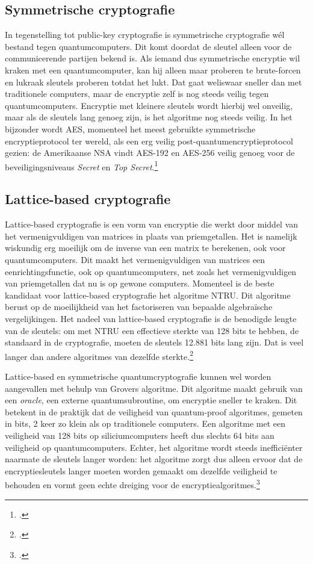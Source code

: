 \documentclass{report} %
\begin{document}
\subsection{Symmetrische cryptografie}
In tegenstelling tot public-key cryptografie is symmetrische cryptografie wél bestand tegen quantumcomputers. Dit komt doordat de sleutel alleen voor de communicerende partijen bekend is. Als iemand dus symmetrische encryptie wil kraken met een quantumcomputer, kan hij alleen maar proberen te brute-forcen en lukraak sleutels proberen totdat het lukt. Dat gaat weliswaar sneller dan met traditionele computers, maar de encryptie zelf is nog steeds veilig tegen quantumcomputers. Encryptie met kleinere sleutels wordt hierbij wel onveilig, maar als de sleutels lang genoeg zijn, is het algoritme nog steeds veilig. In het bijzonder wordt AES, momenteel het meest gebruikte symmetrische encryptieprotocol ter wereld, als een erg veilig post-quantumencryptieprotocol gezien: de Amerikaanse NSA vindt AES-192 en AES-256 veilig genoeg voor de beveiligingsniveaus \textit{Secret} en \textit{Top Secret}.\footnote{\cite{arxiv_quantum}.}
\subsection{Lattice-based cryptografie}
Lattice-based cryptografie is een vorm van encryptie die werkt door middel van het vermenigvuldigen van matrices in plaats van priemgetallen. Het is namelijk wiskundig erg moeilijk om de inverse van een matrix te berekenen, ook voor quantumcomputers. Dit maakt het vermenigvuldigen van matrices een eenrichtingsfunctie, ook op quantumcomputers, net zoals het vermenigvuldigen van priemgetallen dat nu is op gewone computers. Momenteel is de beste kandidaat voor lattice-based cryptografie het algoritme NTRU. Dit algoritme berust op de moeilijkheid van het factoriseren van bepaalde algebraïsche vergelijkingen. Het nadeel van lattice-based cryptografie is de benodigde lengte van de sleutels: om met NTRU een effectieve sterkte van 128 bits te hebben, de standaard in de cryptografie, moeten de sleutels 12.881 bits lang zijn. Dat is veel langer dan andere algoritmes van dezelfde sterkte.\footnote{\cite{arxiv_quantum}.}
\par Lattice-based en symmetrische quantumcryptografie kunnen wel worden aangevallen met behulp van Grovers algoritme. Dit algoritme maakt gebruik van een \textit{oracle}, een externe quantumsubroutine, om encryptie sneller te kraken. Dit betekent in de praktijk dat de veiligheid van quantum-proof algoritmes, gemeten in bits, 2 keer zo klein als op traditionele computers. Een algoritme met een veiligheid van 128 bits op siliciumcomputers heeft dus slechts 64 bits aan veiligheid op quantumcomputers. Echter, het algoritme wordt steeds inefficiënter naarmate de sleutels langer worden: het algoritme zorgt dus alleen ervoor dat de encryptiesleutels langer moeten worden gemaakt om dezelfde veiligheid te behouden en vormt geen echte dreiging voor de encryptiealgoritmes.\footnote{\cite{grover_quantum}.}
\end{document}
